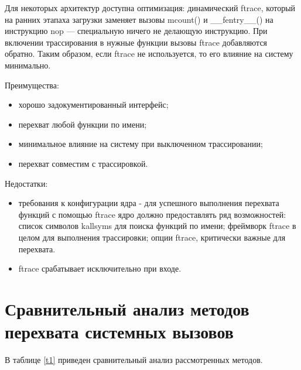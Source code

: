 Для некоторых архитектур доступна оптимизация: динамический ftrace, который на ранних этапаха загрузки заменяет вызовы mcount() и \_\_fentry\_\_() на инструкцию nop — специальную ничего не делающую инструкцию. При включении трассирования в нужные функции вызовы ftrace добавляются обратно. Таким образом, если ftrace не используется, то его влияние на систему минимально.

Преимущества:
\begin{itemize}
	\item хорошо задокументированный интерфейс;
	\item перехват любой функции по имени;
	\item минимальное влияние на систему при выключенном трассировании;
	\item перехват совместим с трассировкой.
\end{itemize}

Недостатки:
\begin{itemize}
	\item требования к конфигурации ядра - для успешного выполнения перехвата функций с помощью ftrace ядро должно предоставлять ряд возможностей: список символов kallsyms для поиска функций по имени; фреймворк ftrace в целом для выполнения трассировки; опции ftrace, критически важные для перехвата.
	\item ftrace срабатывает исключительно при входе.
\end{itemize}

\newpage
\section{Сравнительный анализ методов перехвата системных вызовов}
В таблице \ref{t1} приведен сравнительный анализ рассмотренных методов.

